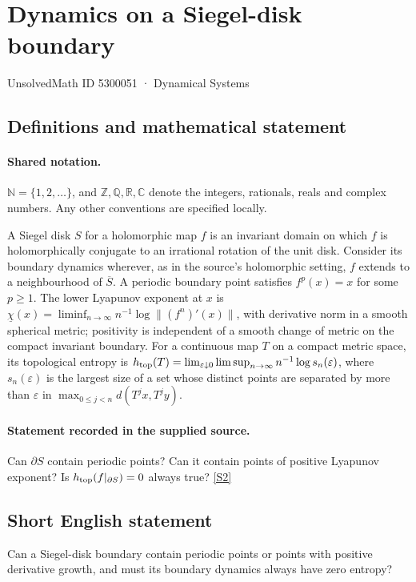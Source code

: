 \documentclass[11pt]{article}
\newcommand{\sref}[2]{\hyperlink{source:#1:#2}{[S#2]}}
\begin{document}
\setcounter{section}{5300050}
\section{Dynamics on a Siegel-disk boundary}\label{5300051}
{\small\sffamily UnsolvedMath ID 5300051 · Dynamical Systems}
\subsection{Definitions and mathematical statement}

\paragraph{Shared notation.}$\mathbb N=\{1,2,\ldots\}$, and $\mathbb Z,\mathbb Q,\mathbb R,\mathbb C$ denote the integers, rationals, reals and complex numbers. Any other conventions are specified locally.


A Siegel disk $S$ for a holomorphic map $f$ is an invariant domain on which $f$ is holomorphically conjugate to an irrational rotation of the unit disk. Consider its boundary dynamics wherever, as in the source's holomorphic setting, $f$ extends to a neighbourhood of $\overline S$. A periodic boundary point satisfies $f^p(x)=x$ for some $p\geq1$. The lower Lyapunov exponent at $x$ is $\underline\chi(x)=\liminf_{n\to\infty}n^{-1}\log\|(f^n)'(x)\|$, with derivative norm in a smooth spherical metric; positivity is independent of a smooth change of metric on the compact invariant boundary. For a continuous map $T$ on a compact metric space, its topological entropy is $h_{\rm top}(T)=\lim_{\varepsilon\downarrow0}\limsup_{n\to\infty}n^{-1}\log s_n(\varepsilon)$, where $s_n(\varepsilon)$ is the largest size of a set whose distinct points are separated by more than $\varepsilon$ in $\max_{0\leq j<n}d(T^jx,T^jy)$.
\paragraph{Statement recorded in the supplied source.}
Can $\partial S$ contain periodic points? Can it contain points of positive Lyapunov exponent? Is $h_{\rm top}(f|_{\partial S})=0$ always true? \sref{5300051}{2}
\subsection{Short English statement}
Can a Siegel-disk boundary contain periodic points or points with positive derivative growth, and must its boundary dynamics always have zero entropy?
\end{document}
